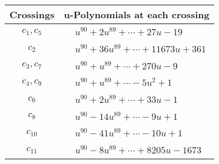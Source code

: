 \documentclass[1p]{elsarticle_modified}
\theoremstyle{definition}
\begin{document}
\begin{tabular}{m{50pt}|m{274pt}}
Crossings & \hspace{64pt}u-Polynomials at each crossing \\
\hline $$\begin{aligned}c_{1},c_{5}\end{aligned}$$&$\begin{aligned}
&u^{90}+2 u^{89}+\cdots+27 u-19
\end{aligned}$\\
\hline $$\begin{aligned}c_{2}\end{aligned}$$&$\begin{aligned}
&u^{90}+36 u^{89}+\cdots+11673 u+361
\end{aligned}$\\
\hline $$\begin{aligned}c_{3},c_{7}\end{aligned}$$&$\begin{aligned}
&u^{90}+u^{89}+\cdots+270 u-9
\end{aligned}$\\
\hline $$\begin{aligned}c_{4},c_{9}\end{aligned}$$&$\begin{aligned}
&u^{90}+u^{89}+\cdots-5 u^2+1
\end{aligned}$\\
\hline $$\begin{aligned}c_{6}\end{aligned}$$&$\begin{aligned}
&u^{90}+2 u^{89}+\cdots+33 u-1
\end{aligned}$\\
\hline $$\begin{aligned}c_{8}\end{aligned}$$&$\begin{aligned}
&u^{90}-14 u^{89}+\cdots-9 u+1
\end{aligned}$\\
\hline $$\begin{aligned}c_{10}\end{aligned}$$&$\begin{aligned}
&u^{90}-41 u^{89}+\cdots-10 u+1
\end{aligned}$\\
\hline $$\begin{aligned}c_{11}\end{aligned}$$&$\begin{aligned}
&u^{90}-8 u^{89}+\cdots+8205 u-1673
\end{aligned}$\\
\hline
\end{tabular}\\~\\
\end{document}
